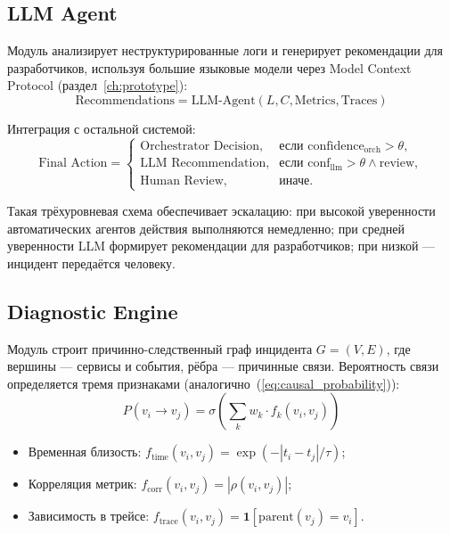 \subsection{LLM Agent}

Модуль анализирует неструктурированные логи и генерирует рекомендации для разработчиков, используя большие языковые модели через Model Context Protocol (раздел~\ref{ch:prototype}):
\begin{equation}
\text{Recommendations} = \text{LLM-Agent}(L, C, \text{Metrics}, \text{Traces})
\label{eq:llm_agent_recommendations}
\end{equation}

Интеграция с остальной системой:
\begin{equation}
\text{Final Action} =
  \begin{cases}
    \text{Orchestrator Decision},
      & \text{если } \text{confidence}_{\text{orch}} > \theta, \\
    \text{LLM Recommendation},
      & \text{если } \text{conf}_{\text{llm}} > \theta \land \text{review}, \\
    \text{Human Review},
      & \text{иначе}.
  \end{cases}
\label{eq:llm_integration_arch}
\end{equation}

Такая трёхуровневая схема обеспечивает эскалацию: при высокой уверенности автоматических агентов действия выполняются немедленно; при средней уверенности LLM формирует рекомендации для разработчиков; при низкой --- инцидент передаётся человеку.

\subsection{Diagnostic Engine}

Модуль строит причинно-следственный граф инцидента $G = (V, E)$, где вершины --- сервисы и события, рёбра --- причинные связи. Вероятность связи определяется тремя признаками (аналогично~(\ref{eq:causal_probability})):
\begin{equation}
P(v_i \to v_j) = \sigma\left(\sum_{k} w_k \cdot f_k(v_i, v_j)\right)
\label{eq:causal_probability_arch}
\end{equation}
\begin{itemize}
    \item Временная близость: $f_{\text{time}}(v_i, v_j) = \exp(-|t_i - t_j|/\tau)$;
    \item Корреляция метрик: $f_{\text{corr}}(v_i, v_j) = |\rho(v_i, v_j)|$;
    \item Зависимость в трейсе: $f_{\text{trace}}(v_i, v_j) = \mathbf{1}[\text{parent}(v_j) = v_i]$.
\end{itemize}

